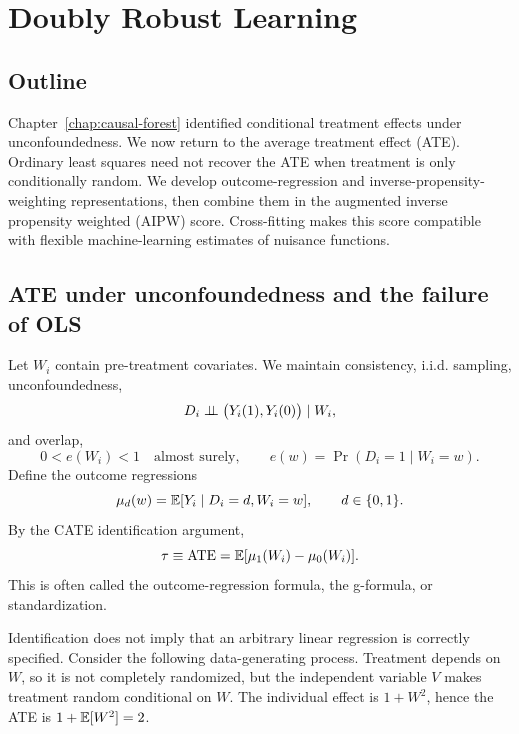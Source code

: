 \chapter{Doubly Robust Learning}
\label{chap:doubly-robust}

\section*{Outline}

Chapter~\ref{chap:causal-forest} identified conditional treatment effects under
unconfoundedness.  We now return to the average treatment effect (ATE).  Ordinary
least squares need not recover the ATE when treatment is only conditionally random.
We develop outcome-regression and inverse-propensity-weighting representations, then
combine them in the augmented inverse propensity weighted (AIPW) score.  Cross-fitting
makes this score compatible with flexible machine-learning estimates of nuisance
functions.

\section{ATE under unconfoundedness and the failure of OLS}
\label{sec:dr-ols}

Let $W_i$ contain pre-treatment covariates.  We maintain consistency, i.i.d.
sampling, unconfoundedness,
\begin{equation}
  D_i\mathrel{\perp\!\!\!\perp}\bigl(Y_i(1),Y_i(0)\bigr)\mid W_i,
  \label{eq:dr-unconfoundedness}
\end{equation}
and overlap,
\begin{equation}
  0<e(W_i)<1\quad\text{almost surely},
  \qquad e(w)=\Pr(D_i=1\mid W_i=w).
  \label{eq:dr-overlap}
\end{equation}
Define the outcome regressions
\begin{equation}
  \mu_d(w)=\mathbb{E}[Y_i\mid D_i=d,W_i=w],\qquad d\in\{0,1\}.
  \label{eq:dr-outcome-regressions}
\end{equation}
By the CATE identification argument,
\begin{equation}
  \tau\equiv\operatorname{ATE}
  =\mathbb{E}[\mu_1(W_i)-\mu_0(W_i)].
  \label{eq:dr-gformula}
\end{equation}
This is often called the outcome-regression formula, the g-formula, or
standardization.

Identification does not imply that an arbitrary linear regression is correctly
specified.  Consider the following data-generating process.  Treatment depends on
$W$, so it is not completely randomized, but the independent variable $V$ makes
treatment random conditional on $W$.  The individual effect is $1+W^2$, hence the
ATE is $1+\mathbb{E}[W^2]=2$.

